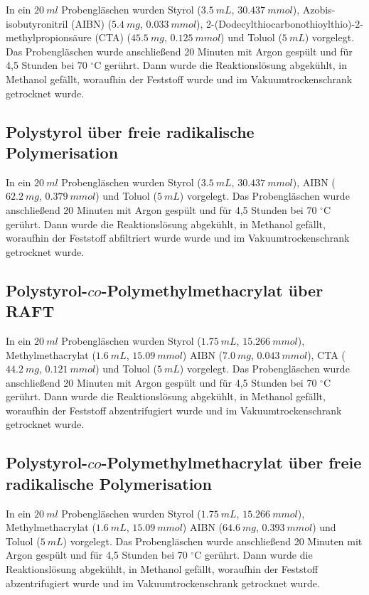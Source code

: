 \documentclass[10pt,a4paper,ngerman]{scrartcl}
\newcommand{\celsius}{^{\circ}\mathrm{C}}
\begin{document}
		In ein $\SI{20}{ml}$ Probengläschen wurden Styrol ($\SI{3,5}{mL}$, $\SI{30,437}{mmol}$), Azobis-isobutyronitril (AIBN) ($\SI{5,4}{mg}$, $\SI{0,033}{mmol}$), 
		2-(Dodecylthiocarbonothioylthio)-2-methylpropionsäure (CTA) ($\SI{45,5}{mg}$, $\SI{0,125}{mmol}$) und Toluol ($\SI{5}{mL}$) vorgelegt. Das Probengläschen wurde 
		anschließend 20 Minuten mit Argon gespült und für 4,5 Stunden bei 70 $\celsius$ gerührt. Dann wurde die Reaktionslösung abgekühlt, in Methanol gefällt, 
		woraufhin der Feststoff  wurde und im Vakuumtrockenschrank getrocknet wurde.

	\subsection{Polystyrol über freie radikalische Polymerisation}

		In ein $\SI{20}{ml}$ Probengläschen wurden Styrol ($\SI{3,5}{mL}$, $\SI{30,437}{mmol}$), AIBN ($\SI{62,2}{mg}$, $\SI{0,379}{mmol}$) und Toluol ($\SI{5}{mL}$) 
		vorgelegt. Das Probengläschen wurde anschließend 20 Minuten mit Argon gespült und für 4,5 Stunden bei 70 $\celsius$ gerührt. Dann wurde die Reaktionslösung 
		abgekühlt, in Methanol gefällt, woraufhin der Feststoff abfiltriert wurde wurde und im Vakuumtrockenschrank getrocknet wurde.
	
	\subsection{Polystyrol-$co$-Polymethylmethacrylat über RAFT}

		In ein $\SI{20}{ml}$ Probengläschen wurden Styrol ($\SI{1,75}{mL}$, $\SI{15,266}{mmol}$), Methylmethacrylat ($\SI{1,6}{mL}$, $\SI{15,09}{mmol}$) AIBN ($\SI{7,0}{mg}$, $\SI{0,043}{mmol}$), 
		CTA ($\SI{44,2}{mg}$, $\SI{0,121}{mmol}$) und Toluol ($\SI{5}{mL}$) vorgelegt. Das Probengläschen wurde 
		anschließend 20 Minuten mit Argon gespült und für 4,5 Stunden bei 70 $\celsius$ gerührt. Dann wurde die Reaktionslösung abgekühlt, in Methanol gefällt, 
		woraufhin der Feststoff abzentrifugiert wurde und im Vakuumtrockenschrank getrocknet wurde.

	\subsection{Polystyrol-$co$-Polymethylmethacrylat über freie radikalische Polymerisation}

		In ein $\SI{20}{ml}$ Probengläschen wurden Styrol ($\SI{1,75}{mL}$, $\SI{15,266}{mmol}$), Methylmethacrylat ($\SI{1,6}{mL}$, $\SI{15,09}{mmol}$) AIBN ($\SI{64,6}{mg}$, $\SI{0,393}{mmol}$) 
		und Toluol ($\SI{5}{mL}$) vorgelegt. Das Probengläschen wurde 
		anschließend 20 Minuten mit Argon gespült und für 4,5 Stunden bei 70 $\celsius$ gerührt. Dann wurde die Reaktionslösung abgekühlt, in Methanol gefällt, 
		woraufhin der Feststoff abzentrifugiert wurde und im Vakuumtrockenschrank getrocknet wurde.
	
\end{document}
